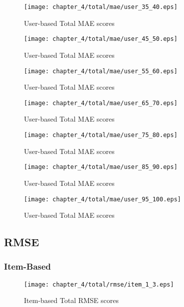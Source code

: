 \begin{figure}[H]
\centering
\texttt{[image: chapter\_4/total/mae/user\_35\_40.eps]}
\caption{User-based Total MAE scores}
\end{figure}

\begin{figure}[H]
\centering
\texttt{[image: chapter\_4/total/mae/user\_45\_50.eps]}
\caption{User-based Total MAE scores}
\end{figure}

\begin{figure}[H]
\centering
\texttt{[image: chapter\_4/total/mae/user\_55\_60.eps]}
\caption{User-based Total MAE scores}
\end{figure}

\begin{figure}[H]
\centering
\texttt{[image: chapter\_4/total/mae/user\_65\_70.eps]}
\caption{User-based Total MAE scores}
\end{figure}

\begin{figure}[H]
\centering
\texttt{[image: chapter\_4/total/mae/user\_75\_80.eps]}
\caption{User-based Total MAE scores}
\end{figure}

\begin{figure}[H]
\centering
\texttt{[image: chapter\_4/total/mae/user\_85\_90.eps]}
\caption{User-based Total MAE scores}
\end{figure}

\begin{figure}[H]
\centering
\texttt{[image: chapter\_4/total/mae/user\_95\_100.eps]}
\caption{User-based Total MAE scores}
\end{figure}

\subsection{RMSE}

\subsubsection{Item-Based}

\begin{figure}[H]
\centering
\texttt{[image: chapter\_4/total/rmse/item\_1\_3.eps]}
\caption{Item-based Total RMSE scores}
\end{figure}

